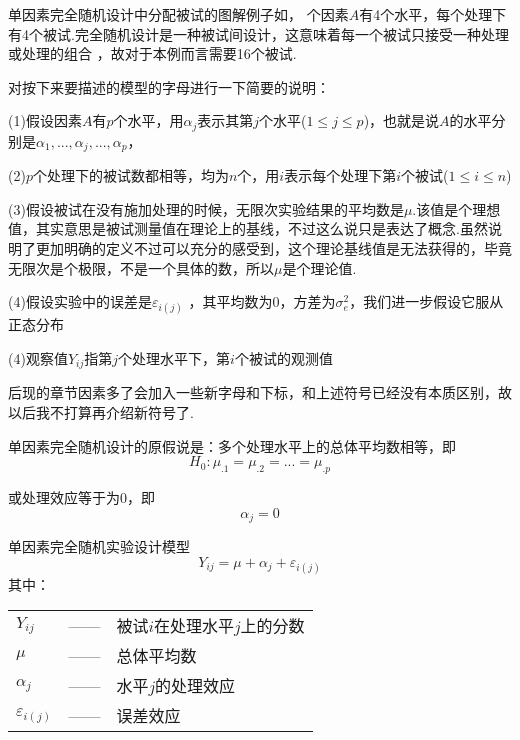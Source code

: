 单因素完全随机设计中分配被试的图解例子如，
个因素$A$有4个水平，每个处理下有4个被试.完全随机设计是一种被试间设计，这意味着每一个被试只接受一种处理或处理的组合
，故对于本例而言需要16个被试.

对按下来要描述的模型的字母进行一下简要的说明：

(1)假设因素$A$有$p$个水平，用$\alpha _j$表示其第$j$个水平($1 \leq j \leq p$)，也就是说$A$的水平分别是$\alpha _1,...,\alpha _j,..., \alpha _p$，

(2)$p$个处理下的被试数都相等，均为$n$个，用$i$表示每个处理下第$i$个被试($1 \leq i \leq n$)

(3)假设被试在没有施加处理的时候，无限次实验结果的平均数是$\mu$.该值是个理想值，其实意思是被试测量值在理论上的基线，不过这么说只是表达了概念.虽然说明了更加明确的定义不过可以充分的感受到，这个理论基线值是无法获得的，毕竟无限次是个极限，不是一个具体的数，所以$\mu$是个理论值.

(4)假设实验中的误差是$\varepsilon _{i\left(j\right)}$
，其平均数为0，方差为$\sigma _e^2$，我们进一步假设它服从正态分布

(4)观察值$Y_{ij}$指第$j$个处理水平下，第$i$个被试的观测值

后现的章节因素多了会加入一些新字母和下标，和上述符号已经没有本质区别，故以后我不打算再介绍新符号了.

单因素完全随机设计的原假说是：多个处理水平上的总体平均数相等，即
$$
H_0: \mu _{.1}=\mu _{.2}=...=\mu _{.p}
$$

或处理效应等于为0，即
$$
\alpha _j=0
$$


单因素完全随机实验设计模型
\begin{equation}
    Y_{ij}=\mu +\alpha _j+\varepsilon _{i\left( j \right)}
\end{equation}
其中：

\begin{table}[h]
	\centering
	{
		\begin{tabular}{lcl}
			$Y_{ij}$ & —— & 被试$i$在处理水平$j$上的分数 \\
			$\mu$ & —— & 总体平均数 \\
			$\alpha _j$ & —— & 水平$j$的处理效应 \\
			$\varepsilon_{i \left( j \right)}$ & —— & 误差效应 \\
		\end{tabular}
	}
\end{table}


